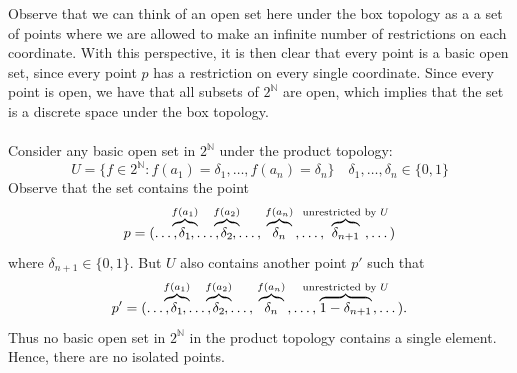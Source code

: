 \documentclass[a4paper,12pt,twoside]{hmcpset}
\begin{document}
\begin{solution}
Observe that we can think of an open set here under the box topology as a 
a set of points where we are allowed to make an infinite number of
restrictions on each coordinate. With this perspective, it is then
clear that every point is a basic open set, since every point $p$ has
a restriction on every single coordinate. Since every point is open,
we have that all subsets of $2^\mathbb{N}$ are open, which implies
that the set is a discrete space under the box topology.
\\
\\
Consider any basic open set in $2^\mathbb{N}$ under the product topology:
\[
   U = \{f \in 2^\mathbb{N} : f(a_1) = \delta_1, \dots , f(a_n) = \delta_n\} \quad \delta_1, \dots , \delta_n \in \{0, 1\}
\] 
Observe that the set contains the point
\[
    p = (\dots, \hspace{-2mm} \overbrace{\delta_{1}}^{\text{$f(a_1)$}}\hspace{-2mm}, \dots, \hspace{-2mm} \overbrace{\delta_{2}}^{\text{$f(a_2)$}}\hspace{-2mm}, \dots,\hspace{0.5mm} \overbrace{\delta_{n}}^{\text{$f(a_n)$}}\hspace{0.5mm}, \dots, \hspace{-6mm} \overbrace{\delta_{n +1}}^{\text{unrestricted by $U$}}\hspace{-6mm}, \dots)
\]
where $\delta_{n+1} \in \{0, 1\}$. But $U$ also contains another point $p'$ such that 
\[
    p' = (\dots, \hspace{-2mm} \overbrace{\delta_{1}}^{\text{$f(a_1)$}}\hspace{-2mm}, \dots, \hspace{-2mm} \overbrace{\delta_{2}}^{\text{$f(a_2)$}}\hspace{-2mm}, \dots,\hspace{0.5mm} \overbrace{\delta_{n}}^{\text{$f(a_n)$}}\hspace{0.5mm}, \dots, \hspace{-4mm} \overbrace{1 - \delta_{n +1}}^{\text{unrestricted by $U$}}\hspace{-4mm}, \dots).
\]
Thus no basic open set in $2^\mathbb{N}$ in the product topology
contains a single element. Hence, there are no isolated points.
\end{solution}
\end{document}
